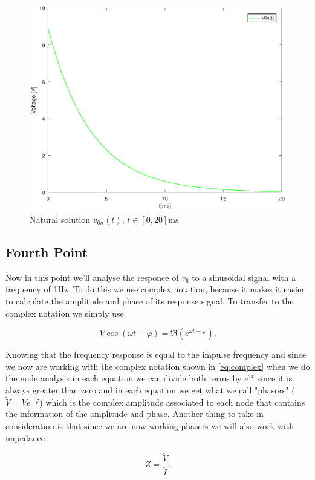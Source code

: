 \begin{figure}[h!] \centering
\includegraphics[width=0.7\linewidth]{naturalsolution.eps}
\caption{Natural solution $v_{6n}(t)$, $t\in[0,20]$ms}
\label{fig:snat}
\end{figure}

\newpage
\subsection{Fourth Point}
\label{ssec:4T}

\par Now in this point we'll analyse the responce of $v_6$ to a sinusoidal signal with a frequency of 1Hz. To do this we use complex notation, because it makes it easier to calculate the amplitude and phase of its response signal. To transfer to the complex notation we simply use 

\begin{equation}
  V\cos(\omega t + \varphi) = \Re (e^{\omega t - \varphi}).
  \label{eq:complex}
\end{equation}

\par Knowing that the frequency response is equal to the impulse frequency and since we now are working with the complex notation shown in \ref{eq:complex} when we do the node analysis in each equation we can divide both terms by $e^{\omega t}$ since it is always greater than zero and in each equation we get what we call "phasors" ($\widetilde{V}=V e^{-\varphi}$) which is the complex amplitude associated to each node that contains the information of the amplitude and phase. Another thing to take in consideration is that since we are now working phasers we will also work with impedance

\begin{equation}
  Z = \frac{\widetilde{V}}{\widetilde{I}}.
  \label{eq:impedance}
\end{equation}

